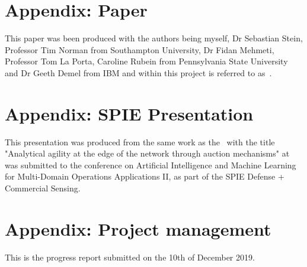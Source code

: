 
\begin{appendices}
\section{Appendix: Paper} \label{app:aamas_paper}
This paper was been produced with the authors being myself, Dr Sebastian Stein, Professor Tim Norman from Southampton
University, Dr Fidan Mehmeti, Professor Tom La Porta, Caroline Rubein from Pennsylvania State University and Dr Geeth
Demel from IBM and within this project is referred to as~\cite{FlexibleResourceAllocation}.



\section{Appendix: SPIE Presentation} \label{app:spie_presentation}
This presentation was produced from the same work as the~\cite{FlexibleResourceAllocation} with the title "Analytical
agility at the edge of the network through auction mechanisms" at was submitted to the conference on Artificial
Intelligence and Machine Learning for Multi-Domain Operations Applications II, as part of the SPIE Defense + Commercial
Sensing.



\section{Appendix: Project management} \label{app:progress_report}
This is the progress report submitted on the 10th of December 2019.


\end{appendices}
